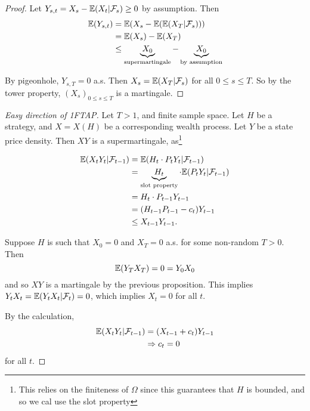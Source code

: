 \begin{proof}
  Let $Y_{s, t} = X_{s} - \E{X_{t} | \mathcal{F}_{s}} \geq 0$ by
  assumption. Then
  \begin{align*}
    \E{Y_{s, t}} & = \E{X_{s} - \E{\E{X_{T} | \mathcal{F}_{s}}}} \\
                 & = \E{X_{s}} - \E{X_{T}}                       \\
                 & \leq \underbrace{X_{0}}_{\text{supermartingale}} -
    \underbrace{X_{0}}_{\text{by assumption}}
  \end{align*}

  By pigeonhole, $Y_{s, T} = 0$ a.s.  Then $X_{s} = \E{X_{T} |
    \mathcal{F}_{s}}$ for all $0 \leq s \leq T$.  So by the tower
  property, $(X_{s})_{0 \leq s \leq T}$ is a martingale.
\end{proof}

\begin{proof}[Easy direction of 1FTAP]
  Let $T > 1$, and finite sample space. Let $H$ be a strategy, and $X
  = X(H)$ be a corresponding wealth process. Let $Y$ be a state price
  density. Then $XY$ is a supermartingale, as\footnote{This relies on
    the finiteness of $\Omega$ since this guarantees that $H$ is
    bounded, and so we cal use the slot property}

  \begin{align*}
    \E{X_{t} Y_{t} | \mathcal{F}_{t-1}} & = \E{H_{t} \cdot P_{t} Y_{t}
      | \mathcal{F}_{t-1}}                                                                                                      \\
                                        & = \underbrace{H_{t}}_{\text{slot property}} \cdot \E{P_{t} Y_{t} | \mathcal{F}_{t-1}} \\
                                        & = H_{t} \cdot P_{t-1} Y_{t-1}                                                         \\
                                        & = (H_{t-1} P_{t-1} - c_{t}) Y_{t-1}                                                   \\
                                        & \leq X_{t-1} Y_{t-1}.
  \end{align*}

  Suppose $H$ is such that $X_{0} = 0$ and $X_{T}= 0$ a.s. for some
  non-random $T > 0$. Then
  \begin{equation}
    \label{eq:10}
    \E{Y_{T} X_{T}} = 0 = Y_{0} X_{0}
  \end{equation} and so $XY$ is a martingale by the previous
  proposition.  This implies $Y_{t} X_{t} = \E{Y_{t} X_{t} |
    \mathcal{F}_{t}} = 0$, which implies $X_{t} = 0$ for all $t$.

  By the calculation,
  \begin{align*}
    \E{X_{t} Y_{t} | \mathcal{F}_{t-1}} & = (X_{t-1} + c_{t}) Y_{t-1}
 \\
                                        & \Rightarrow c_{t} = 0
  \end{align*} for all $t$.
\end{proof}

